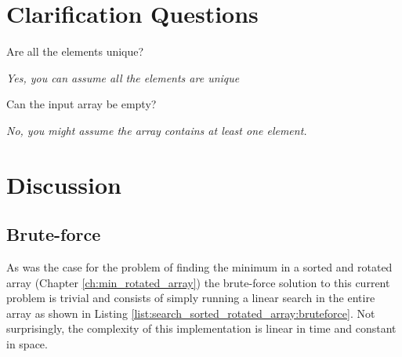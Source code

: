 \section{Clarification Questions}

\begin{QandA}
	\item \begin{questionitem} \begin{question} Are all the elements unique?   \end{question} 	 
    \begin{answered}
		\textit{Yes, you can assume all the elements are unique}
	\end{answered} \end{questionitem}
	\item \begin{questionitem} \begin{question} Can the input array be empty?  \end{question} 	 
    \begin{answered}
		\textit{No, you might assume the array contains at least one element.}
	\end{answered} \end{questionitem}
\end{QandA}


\section{Discussion}
\label{search_sorted_rotated_array:sec:discussion}


\subsection{Brute-force}
\label{search_sorted_rotated_array:sec:bruteforce}
As was the case for the problem of finding the minimum in a sorted and rotated array (Chapter \ref{ch:min_rotated_array}) the brute-force solution to this current problem is trivial and consists of simply running a linear search in the entire array as shown in Listing \ref{list:search_sorted_rotated_array:bruteforce}.
Not surprisingly, the complexity of this implementation is linear in time and constant in space.



